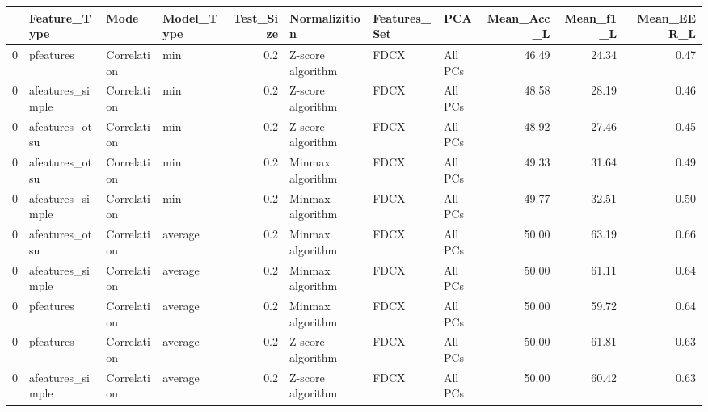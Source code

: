 \begin{tabular}{llllrlllrrr}
\toprule
{} &      Feature\_Type &         Mode & Model\_Type &  Test\_Size &      Normalizition & Features\_Set &      PCA &  Mean\_Acc\_L &  Mean\_f1\_L &  Mean\_EER\_L \\
\midrule
0 &         pfeatures &  Correlation &        min &        0.2 &  Z-score algorithm &         FDCX &  All PCs &       46.49 &      24.34 &        0.47 \\
0 &  afeatures\_simple &  Correlation &        min &        0.2 &  Z-score algorithm &         FDCX &  All PCs &       48.58 &      28.19 &        0.46 \\
0 &    afeatures\_otsu &  Correlation &        min &        0.2 &  Z-score algorithm &         FDCX &  All PCs &       48.92 &      27.46 &        0.45 \\
0 &    afeatures\_otsu &  Correlation &        min &        0.2 &   Minmax algorithm &         FDCX &  All PCs &       49.33 &      31.64 &        0.49 \\
0 &  afeatures\_simple &  Correlation &        min &        0.2 &   Minmax algorithm &         FDCX &  All PCs &       49.77 &      32.51 &        0.50 \\
0 &    afeatures\_otsu &  Correlation &    average &        0.2 &   Minmax algorithm &         FDCX &  All PCs &       50.00 &      63.19 &        0.66 \\
0 &  afeatures\_simple &  Correlation &    average &        0.2 &   Minmax algorithm &         FDCX &  All PCs &       50.00 &      61.11 &        0.64 \\
0 &         pfeatures &  Correlation &    average &        0.2 &   Minmax algorithm &         FDCX &  All PCs &       50.00 &      59.72 &        0.64 \\
0 &         pfeatures &  Correlation &    average &        0.2 &  Z-score algorithm &         FDCX &  All PCs &       50.00 &      61.81 &        0.63 \\
0 &  afeatures\_simple &  Correlation &    average &        0.2 &  Z-score algorithm &         FDCX &  All PCs &       50.00 &      60.42 &        0.63 \\
\bottomrule
\end{tabular}
